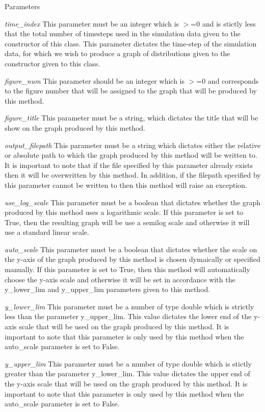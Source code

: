 \begin{DoxyParams}{Parameters}
\item[{\em time\_\-index}]This parameter must be an integer which is $>$=0 and is stictly less that the total number of timesteps used in the simulation data given to the constructor of this class. This parameter dictates the time-\/step of the simulation data, for which we wish to produce a graph of distributions given to the constructor given to this class. \item[{\em figure\_\-num}]This parameter should be an integer which is $>$=0 and corresponds to the figure number that will be assigned to the graph that will be produced by this method. \item[{\em figure\_\-title}]This parameter must be a string, which dictates the title that will be show on the graph produced by this method. \item[{\em output\_\-filepath}]This parameter must be a string which dictates either the relative or absolute path to which the graph produced by this method will be written to. It is important to note that if the file specified by this parameter already exists then it will be overwritten by this method. In addition, if the filepath specified by this parameter cannot be written to then this method will raise an exception. \item[{\em use\_\-log\_\-scale}]This parameter must be a boolean that dictates whether the graph produced by this method uses a logarithmic scale. If this parameter is set to True, then the resulting graph will be use a semilog scale and otherwise it will use a standard linear scale. \item[{\em auto\_\-scale}]This parameter must be a boolean that dictates whether the scale on the y-\/axis of the graph produced by this method is chosen dymaically or specified manually. If this parameter is set to True, then this method will automatically choose the y-\/axis scale and otherwise it will be set in accordance with the y\_\-lower\_\-lim and y\_\-upper\_\-lim parameters given to this method. \item[{\em y\_\-lower\_\-lim}]This parameter must be a number of type double which is strictly less than the parameter y\_\-upper\_\-lim. This value dictates the lower end of the y-\/axis scale that will be used on the graph produced by this method. It is important to note that this parameter is only used by this method when the auto\_\-scale parameter is set to False. \item[{\em y\_\-upper\_\-lim}]This parameter must be a number of type double which is stictly greater than the parameter y\_\-lower\_\-lim. This value dictates the upper end of the y-\/axis scale that will be used on the graph produced by this method. It is important to note that this parameter is only used by this method when the auto\_\-scale parameter is set to False. \end{DoxyParams}
